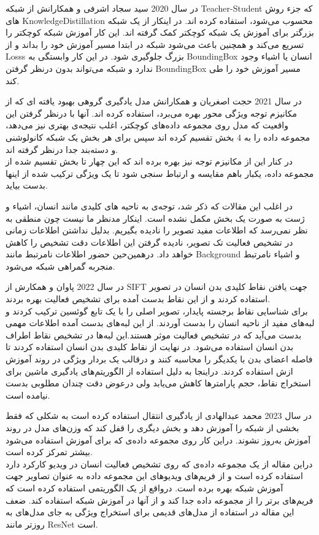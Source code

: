  در سال 2020 سید سجاد اشرفی و همکارانش %
 \cite{Knowledge_dist_recognition}
 از شبکه %
 \gls{Teacher-Student}
 که جزء روش های %
\gls{KnowledgeDistillation}
 محسوب می‌شود، استفاده کرده اند. در اینکار از یک شبکه بزرگتر برای آموزش یک شبکه کوچکتر کمک گرفته اند. این کار آموزش شبکه کوچکتر را تسریع می‌کند و همچنین باعث می‌شود شبکه در ابتدا مسیر آموزش خود را بداند و از %
\glspl{Loss}
  بزرگ جلوگیری شود. در این کار وابستگی به %
\gls{BoundingBox}
  انسان یا اشیاء وجود ندارد و شبکه می‌تواند بدون درنظر گرفتن %
 \gls{BoundingBox}
   مسیر آموزش خود را طی کند.
  
  در سال 2021 حجت اصغریان و همکارانش %
  \cite{Still_image_action_ensemble}
  مدل یادگیری گروهی بهبود یافته ای که از مکانیزم توجه ویژگی محور بهره می‌برد،‌ استفاده کرده اند. آنها با درنظر گرفتن این واقعیت که مدل روی مجموعه داده‌های کوچکتر، اغلب نتیجه‌ی بهتری نیز می‌دهد، مجموعه داده را به 4 بخش تقسیم کرده اند سپس برای هر بخش یک شبکه کانولوشنی و دسته‌بند جدا درنظر گرفته اند.\\
در کنار این از مکانیزم توجه نیز بهره برده اند که این چهار تا بخش تقسیم شده از مجموعه داده، یکبار باهم مقایسه و ارتباط سنجی شود تا یک ویژگی ترکیب شده از اینها بدست بیاید.

در اغلب این مقالات که ذکر شد، توجه‌ی به ناحیه های کلیدی مانند انسان،‌ اشیاء و ژست به صورت یک بخش مکمل نشده است. اینکار مدنظر ما نیست چون منطقی به نظر نمی‌رسد که اطلاعات مفید تصویر را نادیده بگیریم. بدلیل نداشتن اطلاعات زمانی در تشخیص فعالیت تک تصویر، نادیده گرفتن این اطلاعات دقت تشخیص را کاهش خواهد داد. درهمین‌حین حضور اطلاعات نامرتبط مانند %
\gls{Background}
  و اشیاء نامرتبط منجربه گمراهی شبکه می‌شود.
  
  در سال 2022 پاوان و همکارش %
	\cite{action_sift_key_points}
	از SIFT %
	جهت یافتن نقاط کلیدی بدن انسان در تصویر استفاده کردند و از این نقاط بدست آمده برای تشخیص فعالیت بهره بردند.\\
برای شناسایی نقاط برجسته پایدار، تصویر اصلی را با یک تابع گوئسین%
	ترکیب کردند و لبه‌های مفید از ناحیه انسان را بدست آوردند. از این لبه‌های بدست آمده اطلاعات مهمی بدست ‌می‌آید که در تشخیص فعالیت موثر هستند.این لبه‌ها در تشخیص نقاط اطراف بدن انسان استفاده ‌می‌شود. در نهایت از نقاط کلیدی بدن انسان استفاده کردند تا فاصله اعضای بدن با یکدیگر را محاسبه کنند و درقالب یک بردار ویژگی در روند آموزش ازش استفاده کردند. دراینجا به دلیل استفاده از الگوریتم‌های یادگیری ماشین برای استخراج نقاط،‌ حجم پارامتر‌ها کاهش می‌یابد ولی درعوض دقت چندان مطلوبی بدست نیامده است.
	
	در سال 2023 محمد عبدالهادی %
	\cite{hum_action_behavior_transfer_learning}
	از یادگیری انتقال استفاده کرده است به شکلی که فقط بخشی از شبکه را آموزش دهد و بخش دیگری را قفل کند که وزن‌های مدل در روند آموزش به‌روز نشوند. دراین کار روی مجموعه داده‌ی که برای آموزش استفاده می‌شود بیشتر تمرکز کرده است.\\
	دراین مقاله از یک مجموعه داده‌ی که روی تشخیص فعالیت انسان در ویدیو کارکرد دارد استفاده کرده است و از فریم‌های ویدیو‌‌های این مجموعه داده به عنوان تصاویر جهت آموزش شبکه بهره برده است. درواقع از یک الگوریتمی استفاده کرده است که فریم‌های برتر را از مجموعه داده جدا کند و از آنها در آموزش شبکه استفاده کند. ضعف این مقاله در استفاده از مدل‌های قدیمی برای استخراج ویژگی به جای مدل‌های به روزتر مانند ResNet است.
	
